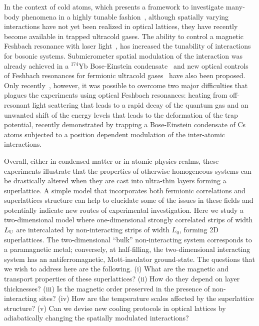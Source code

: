\documentclass[aps,pra,reprint,twocolumn,showpacs,longbibliography,superscriptaddress]{revtex4-1}
\begin{document}
In the context of cold atoms, which presents a framework to investigate many-body phenomena in a highly tunable fashion~\cite{Bloch08, Bloch2012}, although spatially varying interactions have not yet been realized in optical lattices, they have recently become available in trapped ultracold gases. The ability to control a magnetic Feshbach resonance with laser light~\cite{Bauer2009}, has increased the tunability of interactions for bosonic systems. Submicrometer spatial modulation of the interaction was already achieved in a $^{174}$Yb Bose-Einstein condensate~\cite{boson_sl} and new optical controls of Feshbach resonances for fermionic ultracold gases~\cite{fermion_sl_1,fermion_sl_2,Jagannathan2016} have also been proposed. Only recently~\cite{Clark2015}, however, it was possible to overcome two major difficulties that plagues the experiments using optical Feshbach resonances: heating from off-resonant light scattering that leads to a rapid decay of the quantum gas and an unwanted shift of the energy levels that leads to the deformation of the trap potential, recently demonstrated by trapping a Bose-Einstein condensate of Cs atoms subjected to a position dependent modulation of the inter-atomic interactions.

Overall, either in condensed matter or in atomic physics realms, these experiments illustrate that the properties of otherwise homogeneous systems can be drastically altered when they are cast into ultra-thin layers forming a superlattice. A simple model that incorporates both fermionic correlations and superlattices structure can help to elucidate some of the issues in these fields and potentially indicate new routes of experimental investigation.  Here we study a two-dimensional model where one-dimensional strongly correlated  strips of width $L_{\rm U}$ are intercalated by non-interacting strips of width $L_0$, forming 2D superlattices.  The two-dimensional ``bulk'' non-interacting system corresponds to a paramagnetic metal; conversely, at half-filling, the two-dimensional interacting system has an antiferromagnetic, Mott-insulator ground-state.  The questions that we wish to address here are the following. (i)  What are the magnetic and  transport properties of these superlattices? (ii) How do they depend on layer thicknesses? (iii)  Is the magnetic order preserved in the presence of non-interacting sites?  (iv) How are the temperature scales affected by the superlattice structure? (v) Can we devise new cooling protocols in optical lattices by adiabatically changing the spatially modulated interactions?
\end{document}
